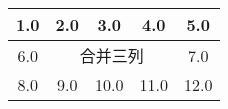 


\begin{tabular}{|c|c|c|c|c|}
\hline
1.0&2.0&3.0&4.0&5.0\\
\hline
6.0&\multicolumn{3}{c|}{合并三列}&7.0\\
\hline
8.0&9.0&10.0&11.0&12.0\\
\hline
\end{tabular}

